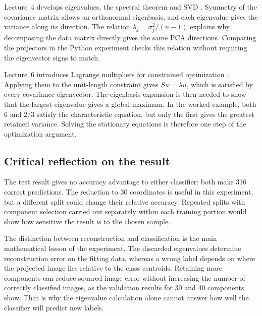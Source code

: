 \documentclass[11pt,a4paper,english]{article}
\numberwithin{equation}{section}
\begin{document}
Lecture~4 develops eigenvalues, the spectral theorem and SVD \cite{lecture4}. Symmetry of the covariance matrix allows an orthonormal eigenbasis, and each eigenvalue gives the variance along its direction. The relation $\lambda_j=\sigma_j^2/(n-1)$ explains why decomposing the data matrix directly gives the same PCA directions. Comparing the projectors in the Python experiment checks this relation without requiring the eigenvector signs to match.

Lecture~6 introduces Lagrange multipliers for constrained optimization \cite{lecture6}. Applying them to the unit-length constraint gives $Su=\lambda u$, which is satisfied by every covariance eigenvector. The eigenbasis expansion is then needed to show that the largest eigenvalue gives a global maximum. In the worked example, both $6$ and $2/3$ satisfy the characteristic equation, but only the first gives the greatest retained variance. Solving the stationary equations is therefore one step of the optimization argument.

\subsection{Critical reflection on the result}
The test result gives no accuracy advantage to either classifier: both make 316 correct predictions. The reduction to 30 coordinates is useful in this experiment, but a different split could change their relative accuracy. Repeated splits with component selection carried out separately within each training portion would show how sensitive the result is to the chosen sample.

The distinction between reconstruction and classification is the main mathematical lesson of the experiment. The discarded eigenvalues determine reconstruction error on the fitting data, whereas a wrong label depends on where the projected image lies relative to the class centroids. Retaining more components can reduce squared image error without increasing the number of correctly classified images, as the validation results for 30 and 40 components show. That is why the eigenvalue calculation alone cannot answer how well the classifier will predict new labels.
\end{document}
